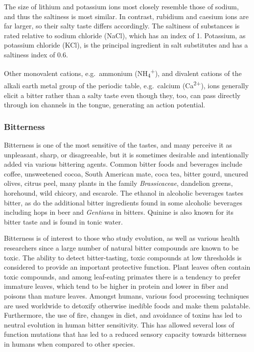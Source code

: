 The size of lithium and potassium ions most closely resemble those of
sodium, and thus the saltiness is most similar. In contrast, rubidium
and caesium ions are far larger, so their salty taste differs
accordingly. The saltiness of substances is rated relative to sodium
chloride (NaCl), which has an index of 1. Potassium, as potassium
chloride (KCl), is the principal ingredient in salt substitutes and has
a saltiness index of 0.6.

Other monovalent cations, e.g.~ammonium
(NH\textsubscript{4}\textsuperscript{+}), and divalent cations of the
alkali earth metal group of the periodic table, e.g.~calcium
(Ca\textsuperscript{2+}), ions generally elicit a bitter rather than a
salty taste even though they, too, can pass directly through ion
channels in the tongue, generating an action potential.

\hypertarget{bitterness}{%
\subsubsection{Bitterness}\label{bitterness}}

Bitterness is one of the most sensitive of the tastes, and many perceive
it as unpleasant, sharp, or disagreeable, but it is sometimes desirable
and intentionally added via various bittering agents. Common bitter
foods and beverages include coffee, unsweetened cocoa, South American
mate, coca tea, bitter gourd, uncured olives, citrus peel, many plants
in the family \emph{Brassicaceae}, dandelion greens, horehound, wild
chicory, and escarole. The ethanol in alcoholic beverages tastes bitter,
as do the additional bitter ingredients found in some alcoholic
beverages including hops in beer and \emph{Gentiana} in bitters. Quinine
is also known for its bitter taste and is found in tonic water.

Bitterness is of interest to those who study evolution, as well as
various health researchers since a large number of natural bitter
compounds are known to be toxic. The ability to detect bitter-tasting,
toxic compounds at low thresholds is considered to provide an important
protective function. Plant leaves often contain toxic compounds, and
among leaf-eating primates there is a tendency to prefer immature
leaves, which tend to be higher in protein and lower in fiber and
poisons than mature leaves. Amongst humans, various food processing
techniques are used worldwide to detoxify otherwise inedible foods and
make them palatable. Furthermore, the use of fire, changes in diet, and
avoidance of toxins has led to neutral evolution in human bitter
sensitivity. This has allowed several loss of function mutations that
has led to a reduced sensory capacity towards bitterness in humans when
compared to other species.

